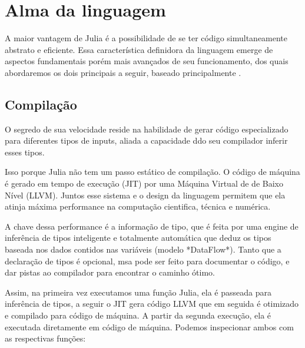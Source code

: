 %


\chapter{Alma da linguagem}
A maior vantagem de Julia é a possibilidade de se ter código simultaneamente abstrato e eficiente. Essa característica definidora da linguagem emerge de aspectos fundamentais porém mais avançados de seu funcionamento, dos quais abordaremos os dois principais a seguir, baseado principalmente \cite{Balbaert2016} \cite{Kwong2020}.


%

\section{Compilação}
O segredo de sua velocidade reside na habilidade de gerar código especializado para diferentes tipos de inputs, aliada a capacidade ddo seu compilador inferir esses tipos. 

Isso porque Julia não tem um passo estático de compilação. O código de máquina é gerado em tempo de execução (JIT) por uma Máquina Virtual de de Baixo Nível (LLVM). Juntos esse sistema e o design da linguagem permitem que ela atinja máxima performance na computação cientifica, técnica e numérica. %

A chave dessa performance é a informação de tipo, que é feita por uma engine de inferência de tipos inteligente e totalmente automática que deduz os tipos baseada nos dados contidos nas variáveis (modelo *DataFlow*). Tanto que a declaração de tipos é opcional, msa pode ser feito para documentar o código, e dar pistas ao compilador para encontrar o caminho ótimo. %

Assim, na primeira vez executamos uma função Julia, ela é passeada para inferência de tipos, a seguir o JIT gera código LLVM que em seguida é otimizado e compilado para código de máquina. A partir da segunda execução, ela é executada diretamente em código de máquina. Podemos inspecionar ambos com as respectivas funções:%

